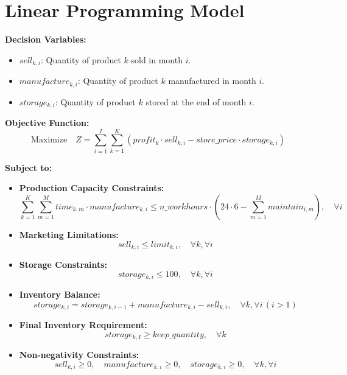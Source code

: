 \documentclass{article}
\begin{document}
\section*{Linear Programming Model}

\textbf{Decision Variables:}
\begin{itemize}
    \item $sell_{k,i}$: Quantity of product $k$ sold in month $i$.
    \item $manufacture_{k,i}$: Quantity of product $k$ manufactured in month $i$.
    \item $storage_{k,i}$: Quantity of product $k$ stored at the end of month $i$.
\end{itemize}

\textbf{Objective Function:}
\begin{equation}
    \text{Maximize} \quad Z = \sum_{i=1}^{I} \sum_{k=1}^{K} (profit_k \cdot sell_{k,i} - store\_price \cdot storage_{k,i})
\end{equation}

\textbf{Subject to:}

\begin{itemize}

    \item \textbf{Production Capacity Constraints:}
    \begin{equation}
        \sum_{k=1}^{K} \sum_{m=1}^{M} time_{k,m} \cdot manufacture_{k,i} \leq n\_workhours \cdot (24 \cdot 6 - \sum_{m=1}^{M} maintain_{i,m}), \quad \forall i
    \end{equation}
    
    \item \textbf{Marketing Limitations:}
    \begin{equation}
        sell_{k,i} \leq limit_{k,i}, \quad \forall k, \forall i
    \end{equation}
    
    \item \textbf{Storage Constraints:}
    \begin{equation}
        storage_{k,i} \leq 100, \quad \forall k, \forall i
    \end{equation}
    
    \item \textbf{Inventory Balance:}
    \begin{equation}
        storage_{k,i} = storage_{k,i-1} + manufacture_{k,i} - sell_{k,i}, \quad \forall k, \forall i \, (i > 1)
    \end{equation}
    
    \item \textbf{Final Inventory Requirement:}
    \begin{equation}
        storage_{k,I} \geq keep\_quantity, \quad \forall k
    \end{equation}

    \item \textbf{Non-negativity Constraints:}
    \begin{equation}
        sell_{k,i} \geq 0, \quad manufacture_{k,i} \geq 0, \quad storage_{k,i} \geq 0, \quad \forall k, \forall i
    \end{equation}

\end{itemize}
\end{document}

